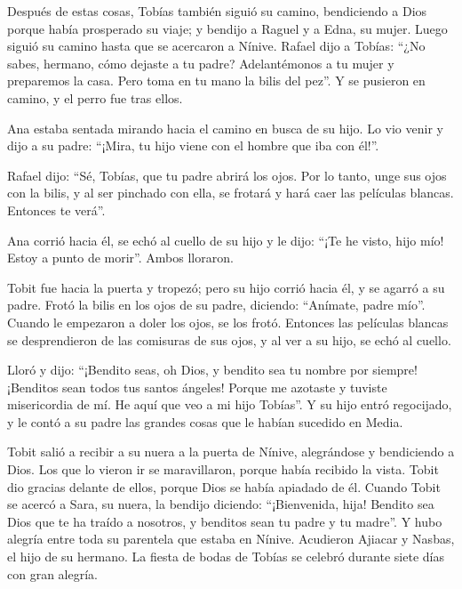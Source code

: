 Después de estas cosas, Tobías también siguió su camino,
bendiciendo a Dios porque había prosperado su viaje; y bendijo a Raguel
y a Edna, su mujer. Luego siguió su camino hasta que se acercaron a
Nínive.  Rafael dijo a Tobías: ``¿No sabes, hermano, cómo
dejaste a tu padre?  Adelantémonos a tu mujer y preparemos
la casa.  Pero toma en tu mano la bilis del pez''. Y se
pusieron en camino, y el perro fue tras ellos.

 Ana estaba sentada mirando hacia el camino en busca de su
hijo.  Lo vio venir y dijo a su padre: ``¡Mira, tu hijo
viene con el hombre que iba con él!''.

 Rafael dijo: ``Sé, Tobías, que tu padre abrirá los ojos.
 Por lo tanto, unge sus ojos con la bilis, y al ser
pinchado con ella, se frotará y hará caer las películas blancas.
Entonces te verá''.

 Ana corrió hacia él, se echó al cuello de su hijo y le
dijo: ``¡Te he visto, hijo mío! Estoy a punto de morir''. Ambos
lloraron.

 Tobit fue hacia la puerta y tropezó; pero su hijo corrió
hacia él,  y se agarró a su padre. Frotó la bilis en los
ojos de su padre, diciendo: ``Anímate, padre mío''. 
Cuando le empezaron a doler los ojos, se los frotó. 
Entonces las películas blancas se desprendieron de las comisuras de sus
ojos, y al ver a su hijo, se echó al cuello.

 Lloró y dijo: ``¡Bendito seas, oh Dios, y bendito sea tu
nombre por siempre! ¡Benditos sean todos tus santos ángeles!
 Porque me azotaste y tuviste misericordia de mí. He aquí
que veo a mi hijo Tobías''. Y su hijo entró regocijado, y le contó a su
padre las grandes cosas que le habían sucedido en Media.

 Tobit salió a recibir a su nuera a la puerta de Nínive,
alegrándose y bendiciendo a Dios. Los que lo vieron ir se maravillaron,
porque había recibido la vista.  Tobit dio gracias
delante de ellos, porque Dios se había apiadado de él. Cuando Tobit se
acercó a Sara, su nuera, la bendijo diciendo: ``¡Bienvenida, hija!
Bendito sea Dios que te ha traído a nosotros, y benditos sean tu padre y
tu madre''. Y hubo alegría entre toda su parentela que estaba en Nínive.
 Acudieron Ajiacar y Nasbas, el hijo de su hermano.
 La fiesta de bodas de Tobías se celebró durante siete
días con gran alegría.


